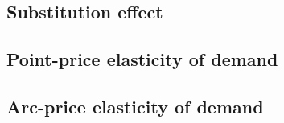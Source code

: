 
\subsection{Substitution effect}

\subsection{Point-price elasticity of demand}

\subsection{Arc-price elasticity of demand}


